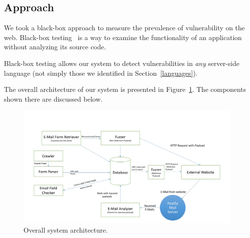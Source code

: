 \subsection{Approach}
\label{sys:appr}
We took a black-box approach to measure the prevalence of \ehi vulnerability on the web. Black-box testing~\cite{Beizer:1995:BTT:202699} is a way to examine the functionality of an application without analyzing its source code.

Black-box testing allows our system to detect \ehi vulnerabilities in \emph{any} server-side language (not simply those we identified in Section~\ref{languages}).

The overall architecture of our system is presented in Figure~\ref{fig:overall}. The components shown there are discussed below.

\begin{figure}
	\centering
	\includegraphics[width=.8\textwidth]{overall}
	\caption{Overall system architecture.}
	\label{fig:overall}
\end{figure}
